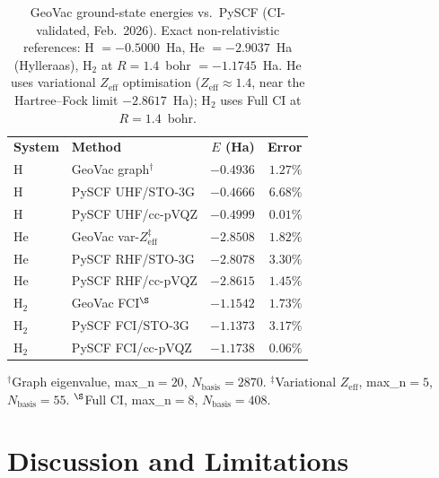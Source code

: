 \documentclass[aps,pra,twocolumn,superscriptaddress,longbibliography,floatfix]{revtex4-2}
\begin{document}
\begin{table}[tb]
  \caption{GeoVac ground-state energies vs.\ PySCF (CI-validated,
  Feb.~2026). Exact non-relativistic references: H $= -0.5000$~Ha,
  He $= -2.9037$~Ha (Hylleraas), H$_2$ at $R=1.4$~bohr $= -1.1745$~Ha.
  He uses variational $Z_\text{eff}$ optimisation ($Z_\text{eff}\approx1.4$,
  near the Hartree--Fock limit $-2.8617$~Ha); H$_2$ uses Full CI at
  $R=1.4$~bohr.}
  \label{tab:pyscf}
  \begin{ruledtabular}
  \begin{tabular}{llrr}
    \textbf{System} & \textbf{Method} & \textbf{$E$ (Ha)} & \textbf{Error} \\
    \colrule
    H      & GeoVac graph$^\dagger$  & $-0.4936$ & $1.27\%$ \\
    H      & PySCF UHF/STO-3G        & $-0.4666$ & $6.68\%$ \\
    H      & PySCF UHF/cc-pVQZ       & $-0.4999$ & $0.01\%$ \\
    \colrule
    He     & GeoVac var-$Z_\text{eff}^\ddagger$ & $-2.8508$ & $1.82\%$ \\
    He     & PySCF RHF/STO-3G        & $-2.8078$ & $3.30\%$ \\
    He     & PySCF RHF/cc-pVQZ       & $-2.8615$ & $1.45\%$ \\
    \colrule
    H$_2$  & GeoVac FCI$^\S$         & $-1.1542$ & $1.73\%$ \\
    H$_2$  & PySCF FCI/STO-3G        & $-1.1373$ & $3.17\%$ \\
    H$_2$  & PySCF FCI/cc-pVQZ       & $-1.1738$ & $0.06\%$ \\
  \end{tabular}
  \end{ruledtabular}
  \begin{flushleft}
  \footnotesize
  ${}^\dagger$Graph eigenvalue, max\_n$=20$, $N_\text{basis}=2870$.
  ${}^\ddagger$Variational $Z_\text{eff}$, max\_n$=5$, $N_\text{basis}=55$.
  ${}^\S$Full CI, max\_n$=8$, $N_\text{basis}=408$.
  \end{flushleft}
\end{table}

\section{Discussion and Limitations}
\label{sec:discussion}
\end{document}
